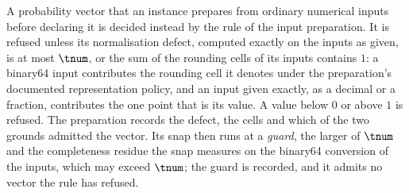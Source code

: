 \begin{requirement}
A probability vector that an instance prepares from ordinary numerical inputs
before declaring it is decided instead by the rule of the input preparation.
It is refused unless its normalisation defect, computed exactly on the inputs
as given, is at most $\tnum$, or the sum of the rounding cells of its inputs
contains $1$: a binary64 input contributes the rounding cell it denotes under
the preparation's documented representation policy, and an input given
exactly, as a decimal or a fraction, contributes the one point that is its
value. A value below $0$ or above $1$ is refused. The preparation records the
defect, the cells and which of the two grounds admitted the vector. Its snap
then runs at a \emph{guard}, the larger of $\tnum$ and the completeness
residue the snap measures on the binary64 conversion of the inputs, which may
exceed $\tnum$; the guard is recorded, and it admits no vector the rule has
refused.
\end{requirement}
